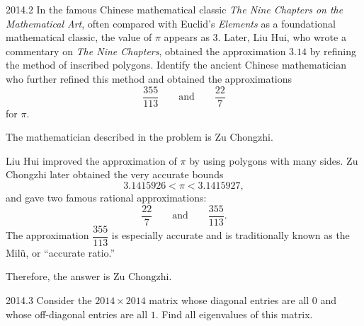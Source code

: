     \begin{pastproblem}{2014.2}
        In the famous Chinese mathematical classic \textit{The Nine Chapters on the Mathematical
        Art}, often compared with Euclid's \textit{Elements} as a foundational mathematical classic,
        the value of $\pi$ appears as $3$. Later, Liu Hui, who wrote a commentary on \textit{The
        Nine Chapters}, obtained the approximation $3.14$ by refining the method of inscribed
        polygons. Identify the ancient Chinese mathematician who further refined this method and
        obtained the approximations
        \[
            \frac{355}{113}
            \qquad\text{and}\qquad
            \frac{22}{7}
        \]
        for $\pi$.
    \end{pastproblem}

    \begin{solution}
        The mathematician described in the problem is Zu Chongzhi.

        Liu Hui improved the approximation of $\pi$ by using polygons with many sides. Zu Chongzhi
        later obtained the very accurate bounds
        \[
            3.1415926<\pi<3.1415927,
        \]
        and gave two famous rational approximations:
        \[
            \frac{22}{7}
            \qquad\text{and}\qquad
            \frac{355}{113}.
        \]
        The approximation $\dfrac{355}{113}$ is especially accurate and is traditionally known as
        the Milü, or ``accurate ratio.''

        Therefore, the answer is $\boxed{\text{Zu Chongzhi}}$.
    \end{solution}

    \begin{pastproblem}{2014.3}
        Consider the $2014\times 2014$ matrix whose diagonal entries are all $0$ and whose
        off-diagonal entries are all $1$. Find all eigenvalues of this matrix.
    \end{pastproblem}

